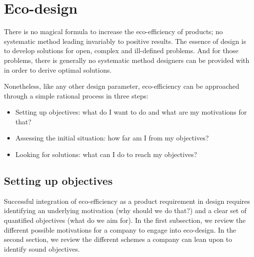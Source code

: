 \documentclass{article}
\begin{document}
\section{Eco-design}
\label{sec:ecodesign}

There is no magical formula to increase the eco-efficiency of products; no systematic method leading invariably to positive results. The essence of design is to develop solutions for open, complex and ill-defined problems. And for those problems, there is generally no systematic method designers can be provided with in order to derive optimal solutions. 

Nonetheless, like any other design parameter, eco-efficiency can be approached through a simple rational process in three steps:
\begin{itemize}
	\item Setting up objectives: what do I want to do and what are my motivations for that?
	\item Assessing the initial situation: how far am I from my objectives?
	\item Looking for solutions: what can I do to reach my objectives?
\end{itemize}

\subsection{Setting up objectives}
\label{sec:objectives}

Successful integration of eco-efficiency as a product requirement in design requires identifying an underlying motivation (why should we do that?) and a clear set of quantified objectives (what do we aim for). In the first subsection, we review the different possible motivations for a company to engage into eco-design. In the second section, we review the different schemes a company can lean upon to identify sound objectives.
\end{document}
